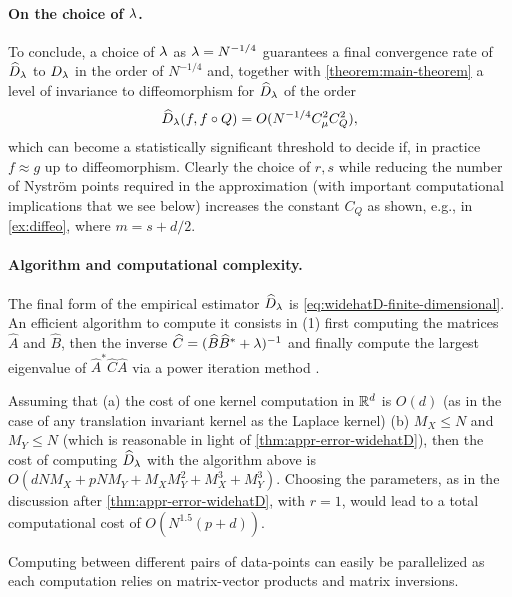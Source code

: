 \paragraph{On the choice of $\lambda$.}
To conclude, a choice of $\lambda$ as $\lambda = N^{-1/4}$ guarantees a final convergence rate of $\widehat{D}_\lambda$ to $D_\lambda$ in the order of $N^{-1/4}$ and, together with \cref{theorem:main-theorem} a level of invariance to diffeomorphism for $\widehat{D}_\lambda$ of the order
$$\widehat{D}_\lambda(f, f \circ Q) = O(N^{-1/4} C_\mu^2 C_Q^2),$$
which can become a statistically significant threshold to decide if, in practice $f \approx g$ up to diffeomorphism.
Clearly the choice of $r,s$ while reducing the number of Nystr\"om points required in the approximation (with important computational implications that we see below) increases the constant $C_Q$ as shown, e.g., in \cref{ex:diffeo}, where $m = s + d/2$.



\paragraph{Algorithm and computational complexity.}
The final form of the empirical estimator $\widehat{D}_\lambda$ is \cref{eq:widehatD-finite-dimensional}. An efficient algorithm to compute it consists in (1) first computing the matrices $\widehat{A}$ and $\widehat{B}$, then the inverse $\widehat{C} = (\widehat{B}\widehat{B}^* + \lambda)^{-1}$ and finally compute the largest eigenvalue of $\widehat{A}^* \widehat{C} \widehat{A}$ via a power iteration method \cite{trefethen1997numerical}. %

Assuming that (a) the cost of one kernel computation in $\mathbb R^d$ is $O(d)$ (as in the case of any translation invariant kernel as the Laplace kernel) (b) $M_X \leq N$ and $M_Y \leq N$ (which is reasonable in light of \cref{thm:appr-error-widehatD}), then the cost of computing $\widehat{D}_\lambda$ with the algorithm above is
$O(d N M_X + p N M_Y + M_XM_Y^2 + M_X^3 + M_Y^3)$.
Choosing the parameters, as in the discussion after \cref{thm:appr-error-widehatD}, with $r = 1$, would lead to a total computational cost of
$O(N^{1.5}(p+d)).$

Computing \Diffy between different pairs of data-points can easily be parallelized as each computation relies on matrix-vector products and matrix inversions.

